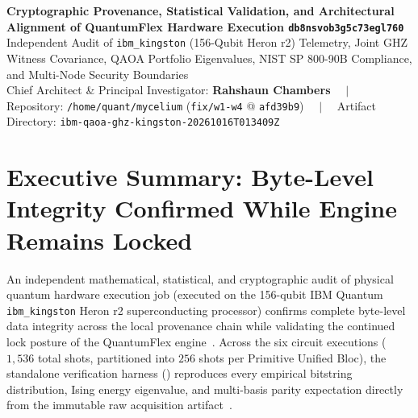 \documentclass[10pt,letterpaper]{article}
\begin{document}
\begin{center}
    {\LARGE\bfseries\color{primary} Cryptographic Provenance, Statistical Validation, and Architectural Alignment of QuantumFlex Hardware Execution \texttt{db8nsvob3g5c73egl760}}\\[8pt]
    {\normalsize Independent Audit of \texttt{ibm\_kingston} (156-Qubit Heron r2) Telemetry, Joint GHZ Witness Covariance, QAOA Portfolio Eigenvalues, NIST SP 800-90B Compliance, and Multi-Node Security Boundaries~\cite{qfx_doc}}\\[4pt]
    {\footnotesize Chief Architect \& Principal Investigator: \textbf{Rahshaun Chambers} $\quad\vert\quad$ Repository: \texttt{/home/quant/mycelium} (\texttt{fix/w1-w4} @ \texttt{afd39b9}) $\quad\vert\quad$ Artifact Directory: \texttt{ibm-qaoa-ghz-kingston-20261016T013409Z}}
\end{center}
\vspace{2pt}

\section{Executive Summary: Byte-Level Integrity Confirmed While Engine Remains Locked}

An independent mathematical, statistical, and cryptographic audit of physical quantum hardware execution job  (executed on the 156-qubit IBM Quantum \texttt{ibm\_kingston} Heron r2 superconducting processor) confirms complete byte-level data integrity across the local provenance chain while validating the continued lock posture of the QuantumFlex engine~\cite{qfx_doc}. Across the six circuit executions ($1{,}536$ total shots, partitioned into $256$ shots per Primitive Unified Bloc), the standalone verification harness () reproduces every empirical bitstring distribution, Ising energy eigenvalue, and multi-basis parity expectation directly from the immutable raw acquisition artifact~\cite{qfx_doc}.
\end{document}

